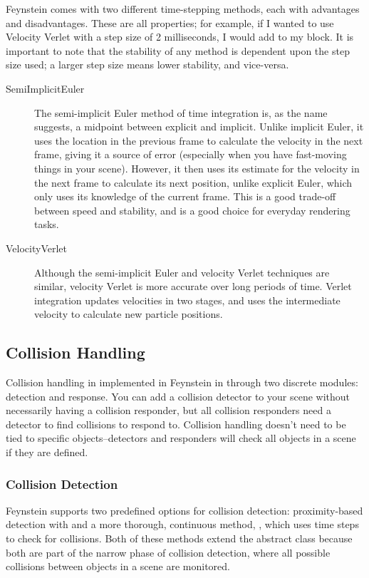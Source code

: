 Feynstein comes with two different time-stepping methods, each with
advantages and disadvantages. These are all properties; for example,
if I wanted to use Velocity Verlet with a step size of 2 milliseconds,
I would add  to my
 block. It is important to note that the stability of
any method is dependent upon the step size used; a larger step size
means lower stability, and vice-versa.

\begin{description}
\item[SemiImplicitEuler] The semi-implicit Euler method of time integration
  is, as the name suggests, a midpoint between explicit and
  implicit. Unlike implicit Euler, it uses the location in the
  previous frame to calculate the velocity in the next frame, giving
  it a source of error (especially when you have fast-moving things in
  your scene). However, it then uses its estimate for the velocity in
  the next frame to calculate its next position, unlike explicit
  Euler, which only uses its knowledge of the current frame. This is a
  good trade-off between speed and stability, and is a good choice for
  everyday rendering tasks.

\item[VelocityVerlet] Although the semi-implicit Euler and velocity
  Verlet techniques are similar, velocity Verlet is more accurate over
  long periods of time. Verlet integration updates velocities in two
  stages, and uses the intermediate velocity to calculate new particle
  positions.
\end{description}

\subsection{Collision Handling}
Collision handling in implemented in Feynstein in through two discrete
modules: detection and response. You can add a collision detector to
your scene without necessarily having a collision responder, but all
collision responders need a detector to find collisions to respond
to. Collision handling doesn't need to be tied to specific
objects--detectors and responders will check all objects in a scene if
they are defined.

\subsubsection{Collision Detection}
Feynstein supports two predefined options for collision detection:
proximity-based detection with  and a more
thorough, continuous method, , which uses
time steps to check for collisions. Both of these methods extend the
abstract  class because both are part of the
narrow phase of collision detection, where all possible collisions
between objects in a scene are monitored.


